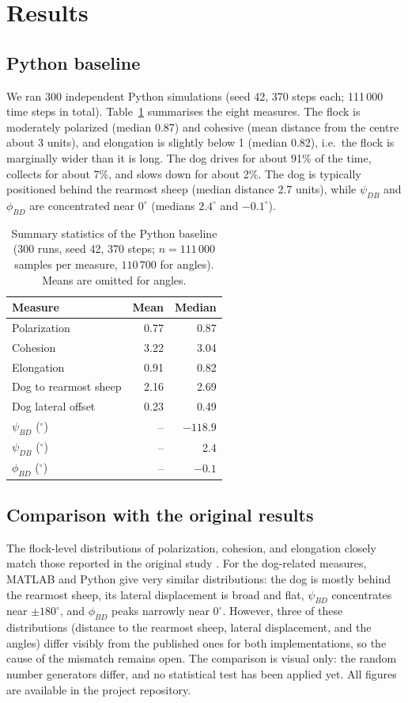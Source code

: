 \documentclass[9pt,twoside]{pnas-new}
\begin{document}
\section{Results}

\subsection{Python baseline}
We ran 300 independent Python simulations (seed 42, 370 steps each; 111\,000 time steps in total). Table~\ref{tab:stats} summarises the eight measures. The flock is moderately polarized (median 0.87) and cohesive (mean distance from the centre about 3 units), and elongation is slightly below 1 (median 0.82), i.e.\ the flock is marginally wider than it is long. The dog drives for about 91\% of the time, collects for about 7\%, and slows down for about 2\%. The dog is typically positioned behind the rearmost sheep (median distance 2.7 units), while $\psi_{DB}$ and $\phi_{BD}$ are concentrated near $0^\circ$ (medians $2.4^\circ$ and $-0.1^\circ$).

\begin{table}[t!]
\centering
\caption{Summary statistics of the Python baseline (300 runs, seed 42, 370 steps; $n=111\,000$ samples per measure, $110\,700$ for angles). Means are omitted for angles.}
\label{tab:stats}
\begin{tabular}{lrr}
Measure & Mean & Median \\
\midrule
Polarization & 0.77 & 0.87 \\
Cohesion & 3.22 & 3.04 \\
Elongation & 0.91 & 0.82 \\
Dog to rearmost sheep & 2.16 & 2.69 \\
Dog lateral offset & 0.23 & 0.49 \\
$\psi_{BD}$ ($^\circ$) & -- & $-118.9$ \\
$\psi_{DB}$ ($^\circ$) & -- & 2.4 \\
$\phi_{BD}$ ($^\circ$) & -- & $-0.1$ \\
\bottomrule
\end{tabular}
\end{table}

\subsection{Comparison with the original results}
The flock-level distributions of polarization, cohesion, and elongation closely match those reported in the original study \cite{jadhav2024}. For the dog-related measures, MATLAB and Python give very similar distributions: the dog is mostly behind the rearmost sheep, its lateral displacement is broad and flat, $\psi_{BD}$ concentrates near $\pm180^\circ$, and $\phi_{BD}$ peaks narrowly near $0^\circ$. However, three of these distributions (distance to the rearmost sheep, lateral displacement, and the angles) differ visibly from the published ones for both implementations, so the cause of the mismatch remains open. The comparison is visual only: the random number generators differ, and no statistical test has been applied yet. All figures are available in the project repository.
\end{document}
